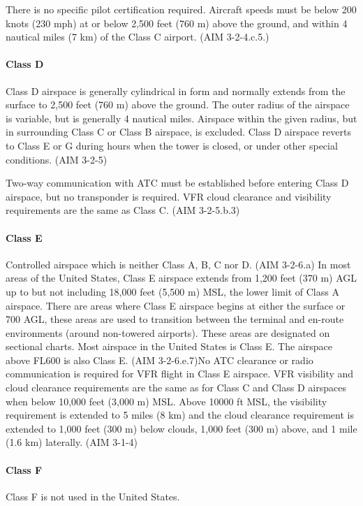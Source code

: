 There is no specific pilot certification required. Aircraft speeds must be below 200 knots (230 mph) at or below 2,500 feet (760 m) above the ground, and within 4 nautical miles (7 km) of the Class C airport. (AIM 3-2-4.c.5.)

\paragraph{Class D}
Class D airspace is generally cylindrical in form and normally extends from the surface to 2,500 feet (760 m) above the ground. The outer radius of the airspace is variable, but is generally 4 nautical miles. Airspace within the given radius, but in surrounding Class C or Class B airspace, is excluded. Class D airspace reverts to Class E or G during hours when the tower is closed, or under other special conditions. (AIM 3-2-5)

Two-way communication with ATC must be established before entering Class D airspace, but no transponder is required. VFR cloud clearance and visibility requirements are the same as Class C. (AIM 3-2-5.b.3)

\paragraph{Class E}
Controlled airspace which is neither Class A, B, C nor D. (AIM 3-2-6.a) In most areas of the United States, Class E airspace extends from 1,200 feet (370 m) AGL up to but not including 18,000 feet (5,500 m) MSL, the lower limit of Class A airspace. There are areas where Class E airspace begins at either the surface or 700 AGL, these areas are used to transition between the terminal and en-route environments (around non-towered airports). These areas are designated on sectional charts. Most airspace in the United States is Class E. The airspace above FL600 is also Class E. (AIM 3-2-6.e.7)No ATC clearance or radio communication is required for VFR flight in Class E airspace. VFR visibility and cloud clearance requirements are the same as for Class C and Class D airspaces when below 10,000 feet (3,000 m) MSL. Above 10000 ft MSL, the visibility requirement is extended to 5 miles (8 km) and the cloud clearance requirement is extended to 1,000 feet (300 m) below clouds, 1,000 feet (300 m) above, and 1 mile (1.6 km) laterally. (AIM 3-1-4)

\paragraph{Class F}
Class F is not used in the United States.

